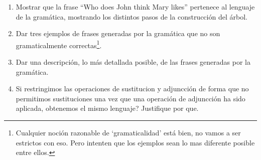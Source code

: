 \documentclass{article}
\begin{document}
\begin{center}
\end{center}

\begin{enumerate}
\item Mostrar que la frase ``Who does John think Mary likes'' pertenece al lenguaje 
de la gram\'atica, mostrando los distintos pasos de la construcci\'on del \'arbol. 

\item Dar tres ejemplos de frases generadas por la gram\'atica que no son gramaticalmente 
correctas\footnote{Cualquier noci\'on razonable de `gramaticalidad' est\'a bien, no vamos 
a ser estrictos con eso. Pero intenten que los ejemplos sean lo mas diferente posible entre 
ellos.}.

\item Dar una descripci\'on, lo m\'as detallada posible, de las frases generadas por 
la gram\'atica. 

\item Si restringimos las operaciones de sustitucion y adjuncci\'on de forma que no permitimos 
sustituciones una vez que una operaci\'on de adjuncci\'on ha sido aplicada, obtenemos el mismo 
lenguaje? Justifique por que. 
\end{enumerate}
\end{document}
